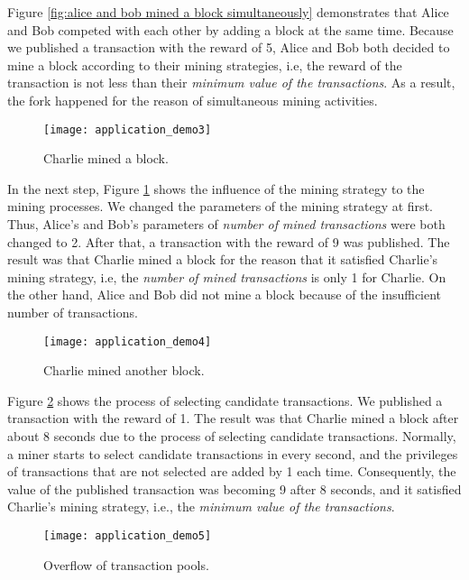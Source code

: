 Figure \ref{fig:alice and bob mined a block simultaneously} demonstrates that Alice and Bob competed with each other by adding a block at the same time. Because we published a transaction with the reward of 5, Alice and Bob both decided to mine a block according to their mining strategies, i.e, the reward of the transaction is not less than their \textit{minimum value of the transactions}. As a result, the fork happened for the reason of simultaneous mining activities.

\begin{figure}[htb]
    \centering
    \texttt{[image: application\_demo3]}
    \caption{Charlie mined a block.}
    \label{fig:charlie mined a block}
\end{figure}

In the next step, Figure \ref{fig:charlie mined a block} shows the influence of the mining strategy to the mining processes. We changed the parameters of the mining strategy at first. Thus, Alice's and Bob's parameters of \textit{number of mined transactions} were both changed to 2. After that, a transaction with the reward of 9 was published. The result was that Charlie mined a block for the reason that it satisfied Charlie's mining strategy, i.e, the \textit{number of mined transactions} is only 1 for Charlie. On the other hand, Alice and Bob did not mine a block because of the insufficient number of transactions.

\begin{figure}[htb]
    \centering
    \texttt{[image: application\_demo4]}
    \caption{Charlie mined another block.}
    \label{fig:charlie mined another block}
\end{figure}

Figure \ref{fig:charlie mined another block} shows the process of selecting candidate transactions. We published a transaction with the reward of 1. The result was that Charlie mined a block after about 8 seconds due to the process of selecting candidate transactions. Normally, a miner starts to select candidate transactions in every second, and the privileges of transactions that are not selected are added by 1 each time. Consequently, the value of the published transaction was becoming 9 after 8 seconds, and it satisfied Charlie's mining strategy, i.e., the \textit{minimum value of the transactions}.

\begin{figure}[htb]
    \centering
    \texttt{[image: application\_demo5]}
    \caption{Overflow of transaction pools.}
    \label{fig:overflow of transaction pools}
\end{figure}

